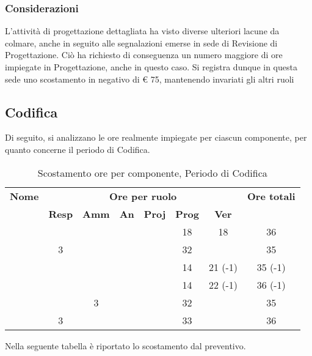 \subsubsection{Considerazioni}
L'attività di progettazione dettagliata ha visto diverse ulteriori lacune da colmare, anche in seguito alle segnalazioni emerse in sede di Revisione di Progettazione. Ciò ha richiesto di conseguenza un numero maggiore di ore impiegate in Progettazione, anche in questo caso. Si registra dunque in questa sede uno scostamento in negativo di € 75, mantenendo invariati gli altri ruoli

\newpage
\subsection{Codifica}

Di seguito, si analizzano le ore realmente impiegate per ciascun componente, per quanto concerne il periodo di Codifica.

\begin{table}[H]
	\begin{center}
		\begin{tabular}{|c|c|c|c|c|c|c|c|}
			\hline
			\textbf{Nome} & \multicolumn{6}{c|}{\textbf{Ore per ruolo}} & \textbf{Ore totali} \\\cline{2-7}
			& \textbf{Resp} & \textbf{Amm} & \textbf{An} & \textbf{Proj} & \textbf{Prog} & \textbf{Ver} & \\
			\hline
			\MC			&		&		&		&		&	18	&	18	&	36	\\
			\hline
			\AN			&	3	&		&		&	 	&	32	&		& 	35	\\
			\hline
			\DAN		&		&		&		&		&	14	&	21 (-1)	&	35 (-1)	\\
			\hline
			\AS			&		&	 	&	 	&		&	14 	& 	22 (-1)	&	36	(-1)\\
			\hline
			\NS 		&		&	3	&		&		&	32	& 		&	35	\\
			\hline
			\DS			& 	3	&		&		&		&	33	&		&	36	\\
			\hline
		\end{tabular}
	\end{center}
	\caption{Scostamento ore per componente, Periodo di Codifica}
\end{table}

Nella seguente tabella è riportato lo scostamento dal preventivo.

